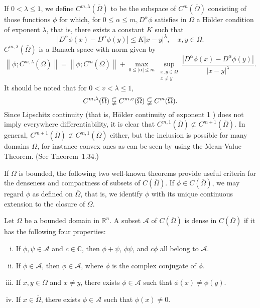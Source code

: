 \begin{para}
  If $0<\lambda \leq 1$, we define $C^{m, \lambda}(\overline{\Omega})$ to be the subspace of $C^m(\overline{\Omega})$ consisting of those functions $\phi$ for which, for $0 \leq \alpha \leq m, D^\alpha \phi$ satisfies in $\Omega$ a Hölder condition of exponent $\lambda$, that is, there exists a constant $K$ such that
  \[
  \left|D^\alpha \phi(x)-D^\alpha \phi(y)\right| \leq K|x-y|^\lambda, \quad x, y \in \Omega .
  \]
  $C^{m, \lambda}(\overline{\Omega})$ is a Banach space with norm given by
  \[
  \left\|\phi ; C^{m, \lambda}(\overline{\Omega})\right\|=\left\|\phi ; C^m(\overline{\Omega})\right\|+\max _{0 \leq|\alpha| \leq m} \sup _{\substack{x, y \in \Omega \\ x \neq y}} \frac{\left|D^\alpha \phi(x)-D^\alpha \phi(y)\right|}{|x-y|^\lambda} .
  \]
  It should be noted that for $0<v<\lambda \leq 1$,
  \[
  C^{m, \lambda}(\overline{\Omega}) \varsubsetneqq C^{m, v}(\overline{\Omega}) \varsubsetneqq C^m(\overline{\Omega}) .
  \]
  Since Lipschitz continuity (that is, Hölder continuity of exponent 1 ) does not imply everywhere differentiability, it is clear that $C^{m, 1}(\overline{\Omega}) \not \subset C^{m+1}(\overline{\Omega})$. In general, $C^{m+1}(\overline{\Omega}) \not \subset C^{m, 1}(\overline{\Omega})$ either, but the inclusion is possible for many domains $\Omega$, for instance convex ones as can be seen by using the Mean-Value Theorem. (See Theorem~1.34.)
\end{para}

\begin{para}
  If $\Omega$ is bounded, the following two well-known theorems provide useful criteria for the denseness and compactness of subsets of $C(\overline{\Omega})$. If $\phi \in C(\overline{\Omega})$, we may regard $\phi$ as defined on $\overline{\Omega}$, that is, we identify $\phi$ with its unique continuous extension to the closure of $\Omega$.
\end{para}

\begin{theorem}
  Let $\Omega$ be a bounded domain in $\mathbb{R}^n$. A subset $\mathscr{A}$ of $C(\overline{\Omega})$ is dense in $C(\overline{\Omega})$ if it has the following four properties:
  \begin{enumerate}[(i)]
    \item If $\phi, \psi \in \mathscr{A}$ and $c \in \mathbb{C}$,
      then $\phi+\psi$, $\phi\psi$, and $c \phi$ all belong to $\mathscr{A}$.
    \item If $\phi \in \mathscr{A}$, then $\bar{\phi} \in \mathscr{A}$,
      where $\bar{\phi}$ is the complex conjugate of $\phi$.
    \item If $x, y \in \overline{\Omega}$ and $x \neq y$,
      there exists $\phi \in \mathscr{A}$ such that $\phi(x) \neq \phi(y)$.
    \item If $x \in \overline{\Omega}$, there exists $\phi \in \mathscr{A}$ 
      such that $\phi(x) \neq 0$.
  \end{enumerate}
\end{theorem}


